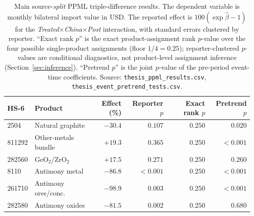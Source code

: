 \begin{table}[H]
\centering
\caption{Main source-\emph{split} PPML triple-difference results. The
dependent variable is monthly bilateral import value in USD. The reported
effect is $100(\exp\hat\beta-1)$ for the
\textit{Treated}$\times$\textit{China}$\times$\textit{Post} interaction,
with standard errors clustered by reporter. ``Exact rank $p$'' is the
exact product-assignment rank $p$-value over the four possible
single-product assignments (floor $1/4=0.25$); reporter-clustered
$p$-values are conditional diagnostics, not product-level assignment
inference (Section~\ref{sec:inference}). ``Pretrend $p$'' is the joint
$p$-value of the pre-period event-time coefficients. Source:
\texttt{thesis\_ppml\_results.csv}, \texttt{thesis\_event\_pretrend\_tests.csv}.}
\label{tab:main_ddd}
\footnotesize
\begin{tabular}{llrrrr}
\toprule
HS-6 & Product & Effect (\%) & Reporter $p$ & Exact rank $p$ & Pretrend $p$ \\
\midrule
2504   & Natural graphite           & $-30.4$ & $0.107$  & $0.250$ & $0.020$ \\
811292 & Other-metals bundle        & $+19.3$ & $0.365$  & $0.250$ & $<0.001$ \\
282560 & GeO$_2$/ZrO$_2$            & $+17.5$ & $0.271$  & $0.250$ & $0.260$ \\
8110   & Antimony metal             & $-86.8$ & $<0.001$ & $0.250$ & $<0.001$ \\
261710 & Antimony ores/conc.        & $-98.9$ & $0.003$  & $0.250$ & $<0.001$ \\
282580 & Antimony oxides            & $-81.5$ & $0.002$  & $0.250$ & $0.680$ \\
\bottomrule
\end{tabular}
\end{table}
